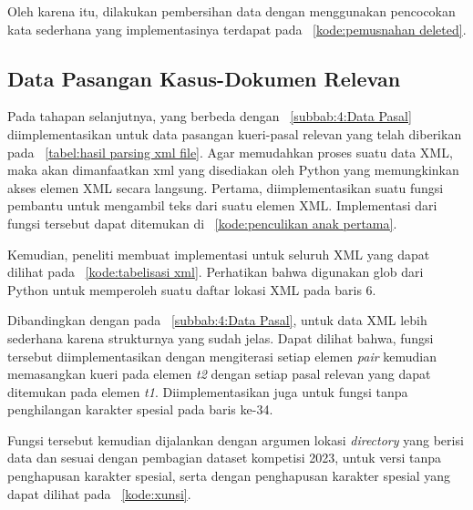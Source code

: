 Oleh karena itu, dilakukan pembersihan data dengan menggunakan pencocokan kata sederhana yang implementasinya terdapat pada \kode{}~\ref{kode:pemusnahan deleted}.

\subsection{Data Pasangan Kasus-Dokumen Relevan}
\label{subbab:4:Data Pasangan Kasus-Dokumen Relevan}
Pada tahapan selanjutnya, \parsing{} yang berbeda  dengan \subbab{}~\ref{subbab:4:Data Pasal} diimplementasikan untuk data pasangan kueri-pasal relevan yang telah diberikan pada \gambar{}~\ref{tabel:hasil parsing xml file}. Agar memudahkan proses \parsing{} suatu data XML, maka akan dimanfaatkan \library{} xml yang disediakan oleh Python yang memungkinkan akses elemen XML secara langsung. Pertama, diimplementasikan suatu fungsi pembantu untuk mengambil teks dari suatu elemen XML. Implementasi dari fungsi tersebut dapat ditemukan di \kode{}~\ref{kode:penculikan anak pertama}.


Kemudian, peneliti membuat implementasi \parsing{} untuk seluruh XML \file{} yang dapat dilihat pada \kode{}~\ref{kode:tabelisasi xml}. Perhatikan bahwa digunakan \library{} glob dari Python untuk memperoleh suatu daftar lokasi \file{} XML pada baris 6.

Dibandingkan dengan \parsing{} pada \subbab{}~\ref{subbab:4:Data Pasal}, \parsing{} untuk data XML lebih sederhana karena strukturnya yang sudah jelas. Dapat dilihat bahwa, fungsi tersebut diimplementasikan dengan mengiterasi setiap elemen \textit{pair} kemudian memasangkan kueri pada elemen \textit{t2} dengan setiap pasal relevan yang dapat ditemukan pada elemen \textit{t1}. Diimplementasikan juga untuk fungsi tanpa penghilangan karakter spesial pada baris ke-34.

Fungsi tersebut kemudian dijalankan dengan argumen lokasi \textit{directory} yang berisi data \training{} dan \testing{} sesuai dengan pembagian dataset kompetisi \COLIEE{} 2023, untuk versi tanpa penghapusan karakter spesial, serta dengan penghapusan karakter spesial yang dapat dilihat pada \kode{}~\ref{kode:xunsi}. 

